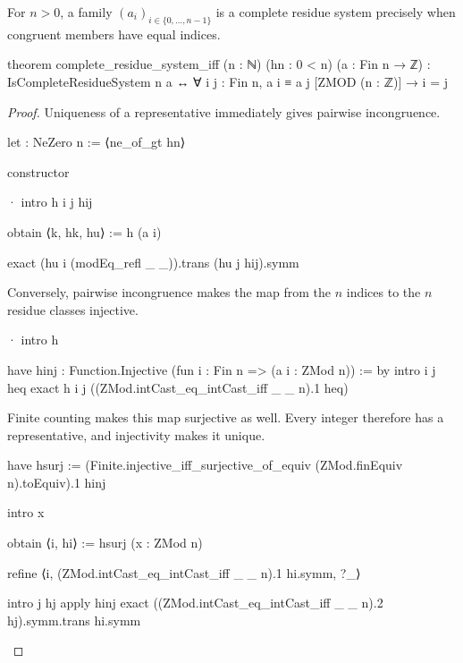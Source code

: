 \begin{theorem}
  \label{ent:thm:complete-residue-system-iff}
  For $n>0$, a family $(a_i)_{i\in\{0,\ldots,n-1\}}$ is a complete residue system precisely when
  congruent members have equal indices.

  \begin{lean}
    theorem complete_residue_system_iff (n : ℕ) (hn : 0 < n) (a : Fin n → ℤ) :
        IsCompleteResidueSystem n a ↔ ∀ i j : Fin n, a i ≡ a j [ZMOD (n : ℤ)] → i = j
  \end{lean}
\end{theorem}

\begin{proof}
  Uniqueness of a representative immediately gives pairwise incongruence.

  \begin{lean}
    let : NeZero n := ⟨ne_of_gt hn⟩

    constructor

    · intro h i j hij

      obtain ⟨k, hk, hu⟩ := h (a i)

      exact (hu i (modEq_refl _ _)).trans (hu j hij).symm
  \end{lean}

  Conversely, pairwise incongruence makes the map from the $n$ indices to the $n$ residue classes
  injective.

  \begin{lean}
    · intro h

      have hinj : Function.Injective (fun i : Fin n => (a i : ZMod n)) := by
        intro i j heq
        exact h i j ((ZMod.intCast_eq_intCast_iff _ _ n).1 heq)
  \end{lean}

  Finite counting makes this map surjective as well.
  Every integer therefore has a representative, and injectivity makes it unique.

  \begin{lean}
    have hsurj := (Finite.injective_iff_surjective_of_equiv (ZMod.finEquiv n).toEquiv).1 hinj

    intro x

    obtain ⟨i, hi⟩ := hsurj (x : ZMod n)

    refine ⟨i, (ZMod.intCast_eq_intCast_iff _ _ n).1 hi.symm, ?_⟩

    intro j hj
    apply hinj
    exact ((ZMod.intCast_eq_intCast_iff _ _ n).2 hj).symm.trans hi.symm
  \end{lean}
\end{proof}

